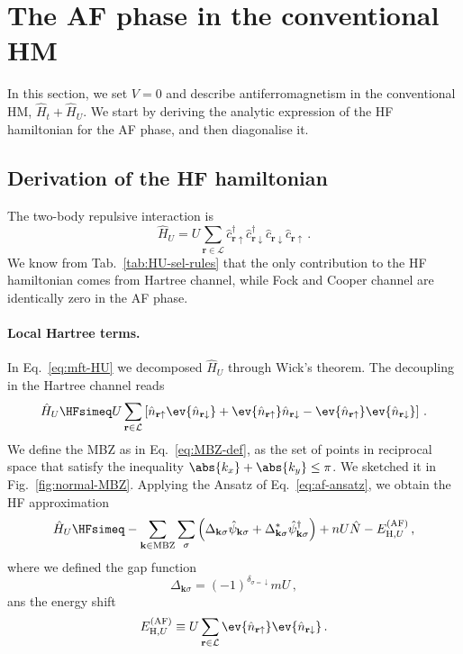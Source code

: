 \section{The AF phase in the conventional HM}\label{sec:af-hm}

In this section, we set $V=0$ and describe antiferromagnetism in the conventional HM, $\hat H_t + \hat H_U$. We start by deriving the analytic expression of the HF hamiltonian for the AF phase, and then diagonalise it.

\subsection{Derivation of the HF hamiltonian }\label{subsec:af-hm-derivation}

The two-body repulsive interaction is
\[
\hat H_U = U \sum_{\mathbf{r}\in\mathcal{L}} \hat c_{\mathbf{r}\uparrow}^\dagger \hat c_{\mathbf{r}\downarrow}^\dagger \hat c_{\mathbf{r}\downarrow} \hat c_{\mathbf{r}\uparrow} \, .
\]
We know from Tab.~\ref{tab:HU-sel-rules} that the only contribution to the HF hamiltonian comes from Hartree channel, while Fock and Cooper channel are identically zero in the AF phase.

\paragraph{Local Hartree terms.}

In Eq.~\eqref{eq:mft-HU} we decomposed $\hat H_U$ through Wick's theorem. The decoupling in the Hartree channel reads
\begin{equation}\label{eq:af-HU-hartree-approx-implicit}
	\hat H_U \HFsimeq U \sum_{\mathbf{r}\in\mathcal{L}} \left[
	\hat n_{\mathbf{r}\uparrow} \ev{\hat n_{\mathbf{r}\downarrow}} + \ev{\hat n_{\mathbf{r}\uparrow}} \hat n_{\mathbf{r}\downarrow} - \ev{\hat n_{\mathbf{r}\uparrow}} \ev{\hat n_{\mathbf{r}\downarrow}}
	\right] \, .
\end{equation}
We define the MBZ as in Eq.~\eqref{eq:MBZ-def}, as the set of points in reciprocal space that satisfy the inequality $\abs{k_x} + \abs{k_y} \le \pi$. We sketched it in Fig.~\ref{fig:normal-MBZ}. Applying the Ansatz of Eq.~\eqref{eq:af-ansatz}, we obtain the HF approximation
\begin{equation}\label{eq:af-HU-hartree-approx}
	\hat H_U \HFsimeq -\sum_{\mathbf{k}\in\mathrm{MBZ}} \sum_\sigma \left(
	\Delta_{\mathbf{k}\sigma} \hat \psi_{\mathbf{k}\sigma} + \Delta_{\mathbf{k}\sigma}^* \hat \psi_{\mathbf{k}\sigma}^\dagger
	\right) + nU \hat N - E_{\mathrm{H},U}^{(\mathrm{AF})} \, ,
\end{equation}
where we defined the gap function
\begin{equation}\label{eq:af-hm-Delta-def}
	\Delta_{\mathbf{k}\sigma} = (-1)^{\delta_{\sigma=\downarrow}} mU \, ,
\end{equation}
ans the energy shift
\begin{equation}\label{eq:af-HU-hartree-Ec-implicit}
	E_{\mathrm{H},U}^{(\mathrm{AF})} \equiv U \sum_{\mathbf{r}\in\mathcal{L}} \ev{\hat n_{\mathbf{r}\uparrow}} \ev{\hat n_{\mathbf{r}\downarrow}} \, .
\end{equation}

